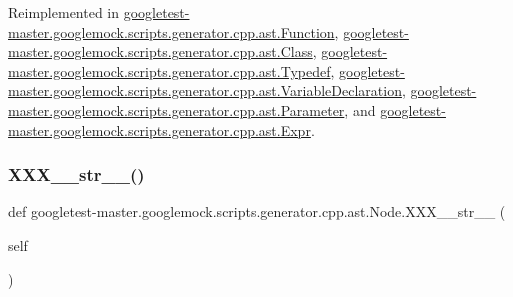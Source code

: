 Reimplemented in \mbox{\hyperlink{classgoogletest-master_1_1googlemock_1_1scripts_1_1generator_1_1cpp_1_1ast_1_1_function_a35a115a6c0454c916a89e77298fa921d}{googletest-\/master.\+googlemock.\+scripts.\+generator.\+cpp.\+ast.\+Function}}, \mbox{\hyperlink{classgoogletest-master_1_1googlemock_1_1scripts_1_1generator_1_1cpp_1_1ast_1_1_class_a572f01c46482ba4dd42fec43cce8ec1a}{googletest-\/master.\+googlemock.\+scripts.\+generator.\+cpp.\+ast.\+Class}}, \mbox{\hyperlink{classgoogletest-master_1_1googlemock_1_1scripts_1_1generator_1_1cpp_1_1ast_1_1_typedef_af8262594635a86d4673333e39a7d3835}{googletest-\/master.\+googlemock.\+scripts.\+generator.\+cpp.\+ast.\+Typedef}}, \mbox{\hyperlink{classgoogletest-master_1_1googlemock_1_1scripts_1_1generator_1_1cpp_1_1ast_1_1_variable_declaration_a95245068c49c43521294e83c28bbc89c}{googletest-\/master.\+googlemock.\+scripts.\+generator.\+cpp.\+ast.\+Variable\+Declaration}}, \mbox{\hyperlink{classgoogletest-master_1_1googlemock_1_1scripts_1_1generator_1_1cpp_1_1ast_1_1_parameter_aad10544558d5150e4a3e11fc537b810e}{googletest-\/master.\+googlemock.\+scripts.\+generator.\+cpp.\+ast.\+Parameter}}, and \mbox{\hyperlink{classgoogletest-master_1_1googlemock_1_1scripts_1_1generator_1_1cpp_1_1ast_1_1_expr_a8c69a2f1475d4ffc7bcff97ad50a4fb0}{googletest-\/master.\+googlemock.\+scripts.\+generator.\+cpp.\+ast.\+Expr}}.

\mbox{\label{classgoogletest-master_1_1googlemock_1_1scripts_1_1generator_1_1cpp_1_1ast_1_1_node_a496b2c76aad75a37d4b1a5a78e4ca8d8}} 
\subsubsection{\texorpdfstring{XXX\_\_str\_\_()}{XXX\_\_str\_\_()}}
{\footnotesize\ttfamily def googletest-\/master.\+googlemock.\+scripts.\+generator.\+cpp.\+ast.\+Node.\+X\+X\+X\+\_\+\+\_\+str\+\_\+\+\_\+ (\begin{DoxyParamCaption}\item[{}]{self }\end{DoxyParamCaption})}



